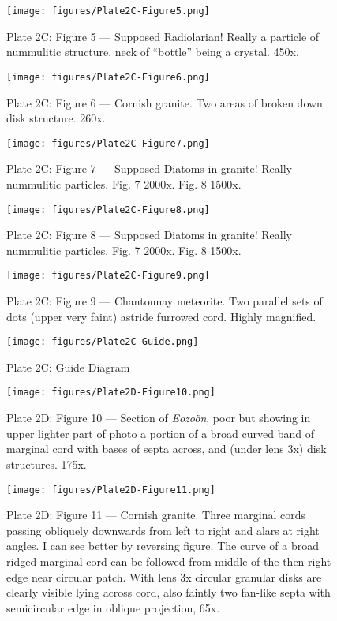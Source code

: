 \documentclass[a4paper, 12pt, oneside]{article}
\begin{document}
\clearpage
\begin{figure}[b]
\centering
\texttt{[image: figures/Plate2C-Figure5.png]}
\caption{\small Plate 2C: Figure 5 --- Supposed Radiolarian! Really a particle of nummulitic structure, neck of ``bottle'' being a crystal. 450x.}
\end{figure}
\clearpage
\begin{figure}[b]
\centering
\texttt{[image: figures/Plate2C-Figure6.png]}
\caption{\small Plate 2C: Figure 6 --- Cornish granite. Two areas of broken down disk structure. 260x.}
\end{figure}
\clearpage
\begin{figure}[b]
\centering
\texttt{[image: figures/Plate2C-Figure7.png]}
\caption{\small Plate 2C: Figure 7 --- Supposed Diatoms in granite! Really nummulitic particles. Fig. 7 2000x. Fig. 8 1500x.}
\end{figure}
\clearpage
\begin{figure}[b]
\centering
\texttt{[image: figures/Plate2C-Figure8.png]}
\caption{\small Plate 2C: Figure 8 --- Supposed Diatoms in granite! Really nummulitic particles. Fig. 7 2000x. Fig. 8 1500x.}
\end{figure}
\clearpage
\begin{figure}[b]
\centering
\texttt{[image: figures/Plate2C-Figure9.png]}
\caption{\small Plate 2C: Figure 9 --- Chantonnay meteorite. Two parallel sets of dots (upper very faint) astride furrowed cord. Highly magnified.}
\end{figure}
\clearpage
\begin{figure}[b]
\centering
\texttt{[image: figures/Plate2C-Guide.png]}
\caption{\small Plate 2C: Guide Diagram}
\end{figure}
\clearpage
{}
\cfoot{\thepage}
\begin{figure}[b]
\centering
\texttt{[image: figures/Plate2D-Figure10.png]}
\caption{\small Plate 2D: Figure 10 --- Section of \emph{Eozoön}, poor but showing in upper lighter part of photo a portion of a broad curved band of marginal cord with bases of septa across, and (under lens 3x) disk structures. 175x.}
\end{figure}
\clearpage
\begin{figure}[b]
\centering
\texttt{[image: figures/Plate2D-Figure11.png]}
\caption{\small Plate 2D: Figure 11 --- Cornish granite. Three marginal cords passing obliquely downwards from left to right and alars at right angles. I can see better by reversing figure. The curve of a broad ridged marginal cord can be followed from middle of the then right edge near circular patch. With lens 3x circular granular disks are clearly visible lying across cord, also faintly two fan-like septa with semicircular edge in oblique projection, 65x.}
\end{figure}
\end{document}
